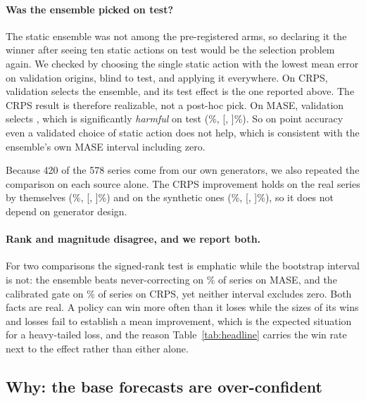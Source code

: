 \paragraph{Was the ensemble picked on test?}
\label{sec:staticcheck}
The static ensemble was not among the pre-registered arms, so declaring it the winner
after seeing ten static actions on test would be the selection problem again. We
checked by choosing the single static action with the lowest mean error on
validation origins, blind to test, and applying it everywhere. On CRPS, validation
selects the ensemble, and its test effect is the one reported above. The CRPS result is
therefore realizable, not a post-hoc pick. On MASE, validation selects
\texttt{\spMaseValChoice}, which is significantly \emph{harmful} on test
(\spMaseValChoiceEffPct\%, [\spMaseValChoiceEffCIlo, \spMaseValChoiceEffCIhi]\%).
So on point accuracy even a validated choice of static action does not help, which is
consistent with the ensemble's own MASE interval including zero.

Because 420 of the 578 series come from our own generators, we also repeated the
comparison on each source alone. The CRPS improvement holds on the \spCrpsEnsRealN{} real
series by themselves (\spCrpsEnsRealPct\%, [\spCrpsEnsRealCIlo, \spCrpsEnsRealCIhi]\%)
and on the synthetic ones (\spCrpsEnsSynPct\%, [\spCrpsEnsSynCIlo,
\spCrpsEnsSynCIhi]\%), so it does not depend on generator design.

\paragraph{Rank and magnitude disagree, and we report both.}
For two comparisons the signed-rank test is emphatic while the bootstrap interval is
not: the ensemble beats never-correcting on \maseAlwaysEnsembleVsNeverWinRate\% of series
on MASE, and the calibrated gate on \crpsRgcCalibratedVsNeverWinRate\% of series on CRPS,
yet neither interval excludes zero. Both facts are real. A policy can win more often than
it loses while the sizes of its wins and losses fail to establish a mean improvement, which is the expected situation for a heavy-tailed loss, and the reason
Table~\ref{tab:headline} carries the win rate next to the effect rather than either
alone.

\subsection{Why: the base forecasts are over-confident}
\label{sec:overconfidence}


